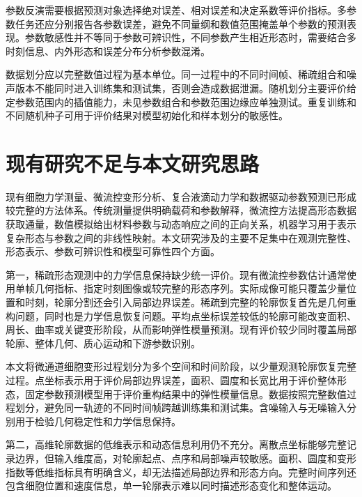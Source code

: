 参数反演需要根据预测对象选择绝对误差、相对误差和决定系数等评价指标。多参数任务还应分别报告各参数误差，避免不同量纲和数值范围掩盖单个参数的预测表现。参数敏感性并不等同于参数可辨识性，不同参数产生相近形态时，需要结合多时刻信息、内外形态和误差分布分析参数混淆\cite{raue2009identifiability}。

数据划分应以完整数值过程为基本单位。同一过程中的不同时间帧、稀疏组合和噪声版本不能同时进入训练集和测试集，否则会造成数据泄漏。随机划分主要评价给定参数范围内的插值能力，未见参数组合和参数范围边缘应单独测试\cite{roberts2017crossvalidation,vabalas2019limited}。重复训练和不同随机种子可用于评价结果对模型初始化和样本划分的敏感性\cite{ovadia2019uncertainty}。

\section{现有研究不足与本文研究思路}

现有细胞力学测量、微流控变形分析、复合液滴动力学和数据驱动参数预测已形成较完整的方法体系。传统测量提供明确载荷和参数解释，微流控方法提高形态数据获取通量，数值模拟给出材料参数与动态响应之间的正向关系，机器学习用于表示复杂形态与参数之间的非线性映射。本文研究涉及的主要不足集中在观测完整性、形态表示、参数可辨识性和模型可靠性四个方面。

第一，稀疏形态观测中的力学信息保持缺少统一评价。现有微流控参数估计通常使用单帧几何指标、指定时刻图像或较完整的形态序列。实际成像可能只覆盖少量位置和时刻，轮廓分割还会引入局部边界误差。稀疏到完整的轮廓恢复首先是几何重构问题，同时也是力学信息恢复问题。平均点坐标误差较低的轮廓可能改变面积、周长、曲率或关键变形阶段，从而影响弹性模量预测。现有评价较少同时覆盖局部轮廓、整体几何、质心运动和下游参数识别。

本文将微通道细胞变形过程划分为多个空间和时间阶段，以少量观测轮廓恢复完整过程。点坐标表示用于评价局部边界误差，面积、圆度和长宽比用于评价整体形态，固定参数预测模型用于评价重构结果中的弹性模量信息。数据按照完整数值过程划分，避免同一轨迹的不同时间帧跨越训练集和测试集。含噪输入与无噪输入分别用于检验几何稳定性和力学信息保持。

第二，高维轮廓数据的低维表示和动态信息利用仍不充分。离散点坐标能够完整记录边界，但输入维度高，对轮廓起点、点序和局部噪声较敏感。面积、圆度和变形指数等低维指标具有明确含义，却无法描述局部边界和形态方向。完整时间序列还包含细胞位置和速度信息，单一轮廓表示难以同时描述形态变化和整体运动。

